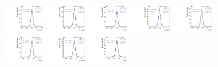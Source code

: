 \begin{figure}[htb]
\includegraphics[width=0.19\textwidth]{plots/Appendix_Recoil_Fits/WmmMC_PF_5TeV_2G/pfu1fit_24.pdf}
\includegraphics[width=0.19\textwidth]{plots/Appendix_Recoil_Fits/WmmMC_PF_5TeV_2G/pfu1fit_25.pdf}
\includegraphics[width=0.19\textwidth]{plots/Appendix_Recoil_Fits/WmmMC_PF_5TeV_2G/pfu1fit_26.pdf}
\includegraphics[width=0.19\textwidth]{plots/Appendix_Recoil_Fits/WmmMC_PF_5TeV_2G/pfu1fit_27.pdf}
\includegraphics[width=0.19\textwidth]{plots/Appendix_Recoil_Fits/WmmMC_PF_5TeV_2G/pfu1fit_28.pdf}
\includegraphics[width=0.19\textwidth]{plots/Appendix_Recoil_Fits/WmmMC_PF_5TeV_2G/pfu1fit_29.pdf}
\includegraphics[width=0.19\textwidth]{plots/Appendix_Recoil_Fits/WmmMC_PF_5TeV_2G/pfu1fit_30.pdf}
\includegraphics[width=0.19\textwidth]{plots/Appendix_Recoil_Fits/WmmMC_PF_5TeV_2G/pfu1fit_31.pdf}

\end{figure}
